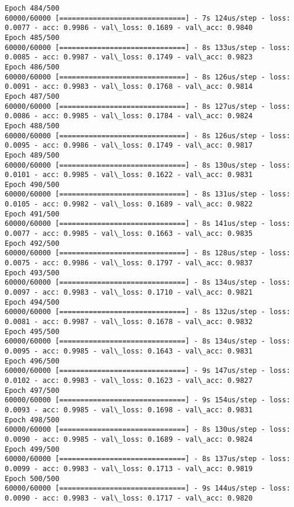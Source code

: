 \documentclass[11pt]{article}
\begin{document}
\begin{Verbatim}[commandchars=\\\{\}]
Epoch 484/500
60000/60000 [==============================] - 7s 124us/step - loss: 0.0077 - acc: 0.9986 - val\_loss: 0.1689 - val\_acc: 0.9840
Epoch 485/500
60000/60000 [==============================] - 8s 133us/step - loss: 0.0085 - acc: 0.9987 - val\_loss: 0.1749 - val\_acc: 0.9823
Epoch 486/500
60000/60000 [==============================] - 8s 126us/step - loss: 0.0091 - acc: 0.9983 - val\_loss: 0.1768 - val\_acc: 0.9814
Epoch 487/500
60000/60000 [==============================] - 8s 127us/step - loss: 0.0086 - acc: 0.9985 - val\_loss: 0.1784 - val\_acc: 0.9824
Epoch 488/500
60000/60000 [==============================] - 8s 126us/step - loss: 0.0095 - acc: 0.9986 - val\_loss: 0.1749 - val\_acc: 0.9817
Epoch 489/500
60000/60000 [==============================] - 8s 130us/step - loss: 0.0101 - acc: 0.9985 - val\_loss: 0.1622 - val\_acc: 0.9831
Epoch 490/500
60000/60000 [==============================] - 8s 131us/step - loss: 0.0105 - acc: 0.9982 - val\_loss: 0.1689 - val\_acc: 0.9822
Epoch 491/500
60000/60000 [==============================] - 8s 141us/step - loss: 0.0077 - acc: 0.9985 - val\_loss: 0.1663 - val\_acc: 0.9835
Epoch 492/500
60000/60000 [==============================] - 8s 128us/step - loss: 0.0075 - acc: 0.9986 - val\_loss: 0.1797 - val\_acc: 0.9837
Epoch 493/500
60000/60000 [==============================] - 8s 134us/step - loss: 0.0097 - acc: 0.9983 - val\_loss: 0.1710 - val\_acc: 0.9821
Epoch 494/500
60000/60000 [==============================] - 8s 132us/step - loss: 0.0081 - acc: 0.9987 - val\_loss: 0.1678 - val\_acc: 0.9832
Epoch 495/500
60000/60000 [==============================] - 8s 134us/step - loss: 0.0095 - acc: 0.9985 - val\_loss: 0.1643 - val\_acc: 0.9831
Epoch 496/500
60000/60000 [==============================] - 9s 147us/step - loss: 0.0102 - acc: 0.9983 - val\_loss: 0.1623 - val\_acc: 0.9827
Epoch 497/500
60000/60000 [==============================] - 9s 154us/step - loss: 0.0093 - acc: 0.9985 - val\_loss: 0.1698 - val\_acc: 0.9831
Epoch 498/500
60000/60000 [==============================] - 8s 130us/step - loss: 0.0090 - acc: 0.9985 - val\_loss: 0.1689 - val\_acc: 0.9824
Epoch 499/500
60000/60000 [==============================] - 8s 137us/step - loss: 0.0099 - acc: 0.9983 - val\_loss: 0.1713 - val\_acc: 0.9819
Epoch 500/500
60000/60000 [==============================] - 9s 144us/step - loss: 0.0090 - acc: 0.9983 - val\_loss: 0.1717 - val\_acc: 0.9820

    \end{Verbatim}

    \begin{center}
    \end{center}
    { \hspace*{\fill} \\}
    
\end{document}
